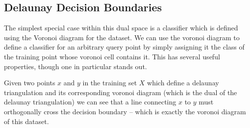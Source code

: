 \subsection{Delaunay Decision Boundaries}

The simplest special case within this dual space is a classifier which
is defined using the Voronoi diagram for the dataset. We can use the
voronoi diagram to define a classifier for an arbitrary query point by
simply assigning it the class of the training point whose voronoi cell
contains it. This has several useful properties, though one in
particular stands out.

Given two points $x$ and $y$ in the training set $X$ which define a delaunay
triangulation and its corresponding voronoi diagram (which is the dual
of the delaunay triangulation) we can see that a line connecting $x$ to
$y$ must orthogonally cross the decision boundary -- which is exactly the voronoi
diagram of this dataset.

